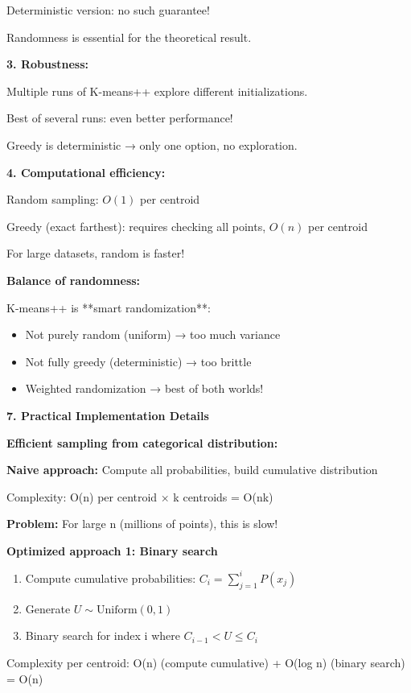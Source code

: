 \documentclass[12pt]{article}
\begin{document}
\begin{explanation}
Deterministic version: no such guarantee!

Randomness is essential for the theoretical result.

\textbf{3. Robustness:}

Multiple runs of K-means++ explore different initializations.

Best of several runs: even better performance!

Greedy is deterministic → only one option, no exploration.

\textbf{4. Computational efficiency:}

Random sampling: $O(1)$ per centroid

Greedy (exact farthest): requires checking all points, $O(n)$ per centroid

For large datasets, random is faster!

\textbf{Balance of randomness:}

K-means++ is **smart randomization**:
\begin{itemize}
    \item Not purely random (uniform) → too much variance
    \item Not fully greedy (deterministic) → too brittle
    \item Weighted randomization → best of both worlds!
\end{itemize}

\textbf{7. Practical Implementation Details}

\textbf{Efficient sampling from categorical distribution:}

\textbf{Naive approach:} Compute all probabilities, build cumulative distribution

Complexity: O(n) per centroid × k centroids = O(nk)

\textbf{Problem:} For large n (millions of points), this is slow!

\textbf{Optimized approach 1: Binary search}

\begin{enumerate}
    \item Compute cumulative probabilities: $C_i = \sum_{j=1}^i P(x_j)$
    \item Generate $U \sim \text{Uniform}(0,1)$
    \item Binary search for index i where $C_{i-1} < U \leq C_i$
\end{enumerate}

Complexity per centroid: O(n) (compute cumulative) + O(log n) (binary search) = O(n)


\end{explanation}
\end{document}
